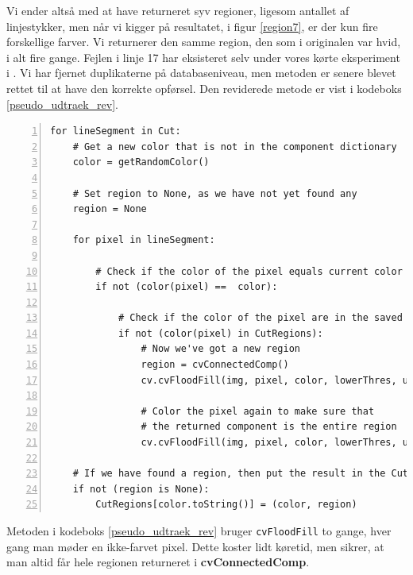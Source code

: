 {Vi ender altså med at have returneret syv regioner, ligesom antallet af
linjestykker, men når vi kigger på resultatet, i figur \ref{region7}, er
der kun fire forskellige farver. Vi returnerer den samme region, den som
i originalen var hvid, i alt fire gange.  Fejlen i linje 17 har
eksisteret selv under vores kørte eksperiment
i .
Vi har fjernet duplikaterne på databaseniveau, men metoden er senere
blevet rettet til at have den korrekte opførsel. Den reviderede metode
er vist i kodeboks \ref{pseudo_udtraek_rev}.

\begin{lstlisting}[caption={Revideret pseudokode til udtrækning af
    regioner. Returnerer ingen
    duplikater.},captionpos=b,label={pseudo_udtraek_rev},numbers=left,
    frame=tb, breaklines=false, float=h]
for lineSegment in Cut:
    # Get a new color that is not in the component dictionary
    color = getRandomColor()

    # Set region to None, as we have not yet found any
    region = None

    for pixel in lineSegment:

        # Check if the color of the pixel equals current color
        if not (color(pixel) ==  color):

            # Check if the color of the pixel are in the saved regions
            if not (color(pixel) in CutRegions):
                # Now we've got a new region
                region = cvConnectedComp()
                cv.cvFloodFill(img, pixel, color, lowerThres, upperThres, region)

                # Color the pixel again to make sure that
                # the returned component is the entire region
                cv.cvFloodFill(img, pixel, color, lowerThres, upperThres, region)

    # If we have found a region, then put the result in the CutRegions-dictionary
    if not (region is None):
        CutRegions[color.toString()] = (color, region)
\end{lstlisting}

Metoden i kodeboks \ref{pseudo_udtraek_rev} bruger \texttt{cvFloodFill}
to gange, hver gang man møder en ikke-farvet pixel. Dette koster lidt
køretid, men sikrer, at man altid får hele regionen returneret i
\textbf{cvConnectedComp}.


}
